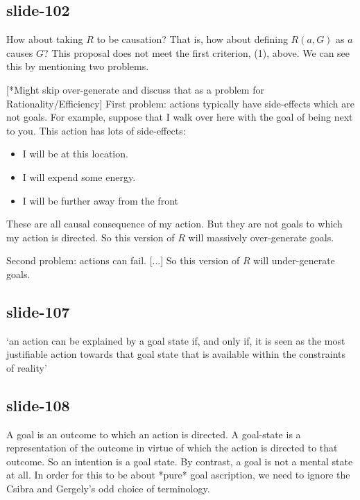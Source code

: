 \documentclass[12pt,\papersize]{extarticle}
\begin{document}
\subsection{slide-102}
How about taking $R$ to be causation?
That is, how about defining $R(a,G)$ as $a$ causes $G$?
This proposal does not meet the first criterion, (1), above.
We can see this by mentioning two problems.

[*Might skip over-generate and discuss that as a problem for Rationality/Efficiency]
First problem: actions typically have side-effects which are not goals.
For example,
suppose that I walk over here with the goal of being next to you.
This action has lots of side-effects:
\begin{itemize}
\item 	I will be at this location.
\item	I will expend some energy.
\item	I will be further away from the front
\end{itemize}
These are all causal consequence of my action.
But they are not goals to which my action is directed.
So this version of $R$ will massively over-generate goals.

Second problem: actions can fail.  [...]
So this version of $R$ will under-generate goals.

\subsection{slide-107}
‘an action can be explained by a goal state if, and only if, it is seen as  the  most justifiable action towards that goal state that is available within the constraints of reality’
\citep[p.~255]{Csibra:1998cx}

\subsection{slide-108}
A goal is an outcome to which an action is directed.
A goal-state is a representation of the outcome in virtue of which
the action is directed to that outcome.
So an intention is a goal state.
By contrast, a goal is not a mental state at all.
In order for this to be about *pure* goal ascription, we need to ignore
the Csibra and Gergely’s odd choice of terminology.
\end{document}
